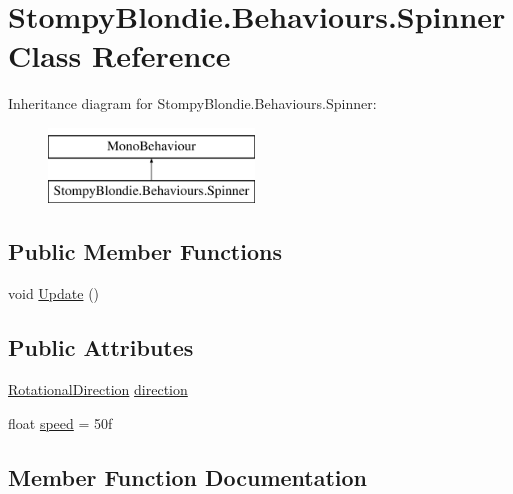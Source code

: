 \hypertarget{class_stompy_blondie_1_1_behaviours_1_1_spinner}{}\section{Stompy\+Blondie.\+Behaviours.\+Spinner Class Reference}
\label{class_stompy_blondie_1_1_behaviours_1_1_spinner}
Inheritance diagram for Stompy\+Blondie.\+Behaviours.\+Spinner\+:\begin{figure}[H]
\begin{center}
\leavevmode
\includegraphics[height=2.000000cm]{class_stompy_blondie_1_1_behaviours_1_1_spinner}
\end{center}
\end{figure}
\subsection*{Public Member Functions}
\begin{DoxyCompactItemize}
\item 
void \mbox{\hyperlink{class_stompy_blondie_1_1_behaviours_1_1_spinner_a33ccb86c5abbeec77a4039cf8be1dd64}{Update}} ()
\end{DoxyCompactItemize}
\subsection*{Public Attributes}
\begin{DoxyCompactItemize}
\item 
\mbox{\hyperlink{namespace_stompy_blondie_1_1_common_1_1_types_aa8d41922aaa5f468ef8e2c8f8e083084}{Rotational\+Direction}} \mbox{\hyperlink{class_stompy_blondie_1_1_behaviours_1_1_spinner_a8443ae6a767b91a6d398416f08fe69be}{direction}}
\item 
float \mbox{\hyperlink{class_stompy_blondie_1_1_behaviours_1_1_spinner_a34128a5d487db9bf69d6e9aa84ec2130}{speed}} = 50f
\end{DoxyCompactItemize}


\subsection{Member Function Documentation}
\mbox{\label{class_stompy_blondie_1_1_behaviours_1_1_spinner_a33ccb86c5abbeec77a4039cf8be1dd64}} 
